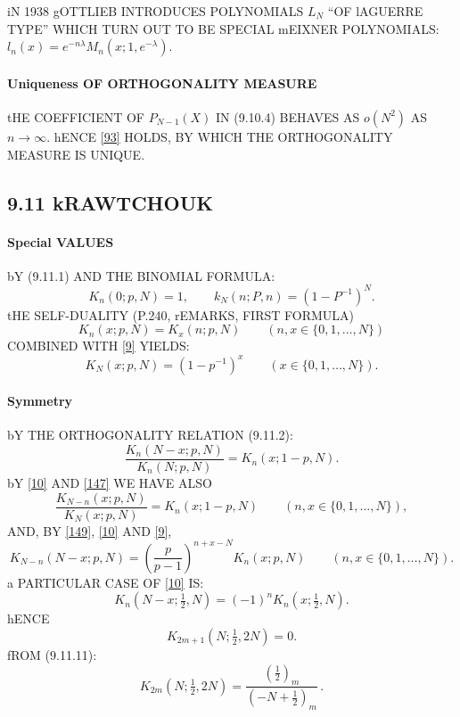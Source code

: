 \documentclass[twoside,11pt]{article}
\newcommand\la\lambda
\newcommand\thalf{\tfrac12}
\newcommand\iy\infty
\begin{document}
iN 1938 gOTTLIEB \cite[\S2]{K1} INTRODUCES POLYNOMIALS $L_N$ ``OF lAGUERRE TYPE'' 
WHICH TURN OUT TO BE SPECIAL mEIXNER POLYNOMIALS: 
$l_n(x)=e^{-n\la} M_n(x;1,e^{-\la})$. 
% 
\paragraph{Uniqueness OF ORTHOGONALITY MEASURE} 
tHE COEFFICIENT OF $P_{N-1}(X)$ IN (9.10.4) BEHAVES AS $o(N^2)$ AS $n\to\iy$. 
hENCE \eqref{93} HOLDS, BY WHICH THE ORTHOGONALITY MEASURE IS UNIQUE. 
% 
\subsection*{9.11 kRAWTCHOUK} 
\label{sec9.11} 
% 
\paragraph{Special VALUES} 
bY (9.11.1) AND THE BINOMIAL FORMULA: 
\begin{equation} 
K_n(0;p,N)=1,\qquad 
k_N(n;P,n)=(1-P^{-1})^N. 
\label{9} 
\end{equation} 
tHE SELF-DUALITY (P.240, rEMARKS, FIRST FORMULA) 
\begin{equation} 
K_n(x;p,N)=K_x(n;p,N)\qquad (n,x\in \{0,1,\ldots,N\}) 
\label{147} 
\end{equation} 
COMBINED WITH \eqref{9} YIELDS: 
\begin{equation} 
K_N(x;p,N)=(1-p^{-1})^x\qquad(x\in\{0,1,\ldots,N\}). 
\label{148} 
\end{equation} 
% 
\paragraph{Symmetry} 
bY THE ORTHOGONALITY RELATION (9.11.2): 
\begin{equation} 
\frac{K_n(N-x;p,N)}{K_n(N;p,N)}=K_n(x;1-p,N). 
\label{10} 
\end{equation} 
bY \eqref{10} AND \eqref{147} WE HAVE ALSO 
\begin{equation} 
\frac{K_{N-n}(x;p,N)}{K_N(x;p,N)}=K_n(x;1-p,N) 
\qquad(n,x\in\{0,1,\ldots,N\}), 
\label{149} 
\end{equation} 
AND, BY \eqref{149}, \eqref{10} AND \eqref{9}, 
\begin{equation} 
K_{N-n}(N-x;p,N)=\left(\frac p{p-1}\right)^{n+x-N}K_n(x;p,N) 
\qquad(n,x\in\{0,1,\ldots,N\}). 
\label{150} 
\end{equation} 
a PARTICULAR CASE OF \eqref{10} IS: 
\begin{equation} 
K_n(N-x;\thalf,N)=(-1)^n K_n(x;\thalf,N). 
\label{11} 
\end{equation} 
hENCE 
\begin{equation} 
K_{2m+1}(N;\thalf,2N)=0. 
\label{12} 
\end{equation} 
fROM (9.11.11): 
\begin{equation} 
K_{2m}(N;\thalf,2N)=\frac{(\thalf)_m}{(-N+\thalf)_m}\,. 
\label{13} 
\end{equation} 
% 
\end{document}
